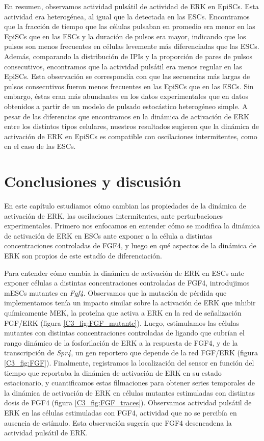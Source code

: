 \documentclass[./main.tex]{subfiles}
\begin{document}
En resumen, observamos actividad pulsátil de actividad de ERK en EpiSCs. Esta actividad era heterogénea, al igual que la detectada en las ESCs. Encontramos que la fracción de tiempo que las células pulsaban en promedio era menor en las EpiSCs que en las ESCs y la duración de pulsos era mayor, indicando que los pulsos son menos frecuentes en células levemente más diferenciadas que las ESCs. Además, comparando la distribución de IPIs y la proporción de pares de pulsos consecutivos, encontramos que la actividad pulsátil era menos regular en las EpiSCs. Esta observación se correspondía con que las secuencias más largas de pulsos consecutivos fueron menos frecuentes en las EpiSCs que en las ESCs. Sin embargo, éstas eran más abundantes en los datos experimentales que en datos obtenidos a partir de un modelo de pulsado estocástico heterogéneo simple. A pesar de las diferencias que encontramos en la dinámica de activación de ERK entre los distintos tipos celulares, nuestros resultados sugieren que la dinámica de activación de ERK en EpiSCs es compatible con oscilaciones intermitentes, como en el caso de las ESCs.


\section{Conclusiones y discusión}


En este capítulo estudiamos cómo cambian las propiedades de la dinámica de activación de ERK, las oscilaciones intermitentes, ante perturbaciones experimentales. Primero nos enfocamos en entender cómo se modifica la dinámica de activación de ERK en ESCs ante exponer a la célula a distintas concentraciones controladas de FGF4, y luego en qué aspectos de la dinámica de ERK son propios de este estadío de diferenciación.


Para entender cómo cambia la dinámica de activación de ERK en ESCs ante exponer células a distintas concentraciones controladas de FGF4, introdujimos mESCs mutantes en \textit{Fgf4}. Observamos que la mutación de pérdida que implementamos tenía un impacto similar sobre la activación de ERK que inhibir químicamente MEK, la proteína que activa a ERK en la red de señalización FGF/ERK (figura \ref{C3_fig:FGF_mutante}). Luego, estimulamos las células mutantes con distintas concentraciones controladas de ligando que cubrían el rango dinámico de la fosforilación de ERK a la respuesta de FGF4, y de la transcripción de \textit{Spr4}, un gen reportero que depende de la red FGF/ERK (figura \ref{C3_fig:FGF}). Finalmente, registramos la localización del sensor en función del tiempo que reportaba la dinámica de activación de ERK en su estado estacionario, y cuantificamos estas filmaciones para obtener series temporales de la dinámica de activación de ERK en células mutantes estimuladas con distintas dosis de FGF4 (figura \ref{C3_fig:FGF_traces}). Observamos actividad pulsátil de ERK en las células estimuladas con FGF4, actividad que no se percibía en ausencia de estímulo. Esta observación sugería que FGF4 desencadena la actividad pulsátil de ERK. 
\end{document}
